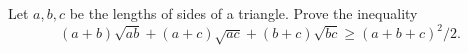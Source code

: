 Let $a, b, c$ be the lengths of sides of a triangle. Prove the inequality
$$(a+b)\sqrt{ab}+(a+c)\sqrt{ac}+(b+c)\sqrt{bc} \geq (a+b+c)^2/2.$$